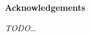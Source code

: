 \thispagestyle{empty}


\begin{center}
  {\bf \Huge Acknowledgements}
\end{center}

\vspace{4cm}
\emph{TODO\ldots}